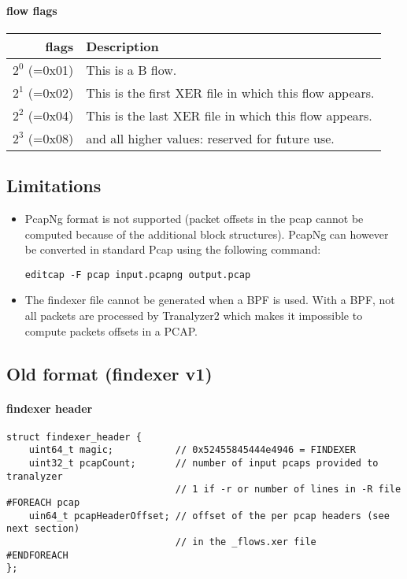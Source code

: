 \documentclass[documentation]{subfiles}
\begin{document}
\paragraph{flow flags}

\begin{center}
    \begin{tabular}{rl}
        \toprule
        {\bf flags} & {\bf Description} \\
        \midrule
        $2^0$ (=0x01) & This is a B flow.\\
        $2^1$ (=0x02) & This is the first XER file in which this flow appears.\\
        $2^2$ (=0x04) & This is the last XER file in which this flow appears.\\
        $2^3$ (=0x08) & and all higher values: reserved for future use.\\
        \bottomrule
    \end{tabular}
\end{center}

\subsection{Limitations}

\begin{itemize}
    \item PcapNg format is not supported (packet offsets in the pcap cannot be computed because of the
        additional block structures). PcapNg can however be converted in standard Pcap using the
        following command:

    {\tt editcap -F pcap input.pcapng output.pcap}
    \item The findexer file cannot be generated when a BPF is used. With a BPF, not all packets are
        processed by Tranalyzer2 which makes it impossible to compute packets offsets in a PCAP.
\end{itemize}

\subsection{Old format (findexer v1)}

\paragraph{findexer header}
\begin{verbatim}
struct findexer_header {
    uint64_t magic;           // 0x52455845444e4946 = FINDEXER
    uint32_t pcapCount;       // number of input pcaps provided to tranalyzer
                              // 1 if -r or number of lines in -R file
#FOREACH pcap
    uin64_t pcapHeaderOffset; // offset of the per pcap headers (see next section)
                              // in the _flows.xer file
#ENDFOREACH
};
\end{verbatim}
\end{document}
